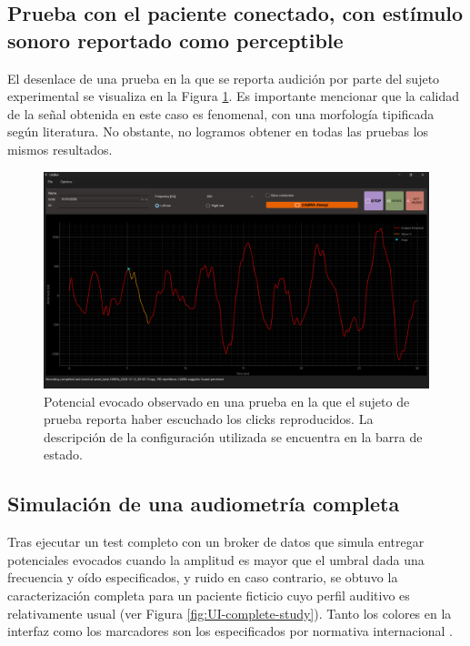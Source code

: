 \subsection{Prueba con el paciente conectado, con estímulo sonoro reportado como perceptible}

El desenlace de una prueba en la que se reporta audición por parte del sujeto experimental se visualiza en la Figura \ref{fig:UI-EP}. Es importante mencionar que la calidad de la señal obtenida en este caso es fenomenal, con una morfología tipificada según literatura. No obstante, no logramos obtener en todas las pruebas los mismos resultados.

\begin{figure}[H]
    \centering
    \includegraphics[width=1\linewidth]{figuras/UI-EP.png}
    \caption{Potencial evocado observado en una prueba en la que el sujeto de prueba reporta haber escuchado los clicks reproducidos. La descripción de la configuración utilizada se encuentra en la barra de estado.}
    \label{fig:UI-EP}
\end{figure}

\subsection{Simulación de una audiometría completa}

Tras ejecutar un test completo con un broker de datos que simula entregar potenciales evocados cuando la amplitud es mayor que el umbral dada una frecuencia y oído especificados, y ruido en caso contrario, se obtuvo la caracterización completa para un paciente ficticio cuyo perfil auditivo es relativamente usual (ver Figura \ref{fig:UI-complete-study}). Tanto los colores en la interfaz como los marcadores son los especificados por normativa internacional \cite{ISO389}.

